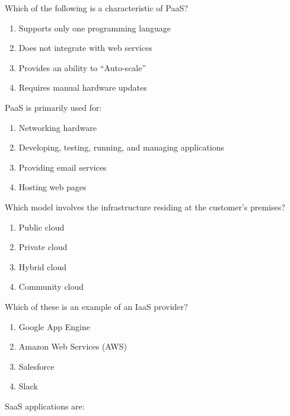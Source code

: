 \documentclass[11pt,a4paper]{article}
\begin{document}
\begin{parts}
  \item Which of the following is a characteristic of PaaS?
  
\begin{enumerate}[label=(\alph*)]
    \item Supports only one programming language
    \item Does not integrate with web services
    \item Provides an ability to ``Auto-scale''
    \item Requires manual hardware updates
  \end{enumerate}
  
  \item PaaS is primarily used for:
  
\begin{enumerate}[label=(\alph*)]
    \item Networking hardware
    \item Developing, testing, running, and managing applications
    \item Providing email services
    \item Hosting web pages
  \end{enumerate}
  
  \item Which model involves the infrastructure residing at the customer's premises?
  
\begin{enumerate}[label=(\alph*)]
    \item Public cloud
    \item Private cloud
    \item Hybrid cloud
    \item Community cloud
  \end{enumerate}
  
  \item Which of these is an example of an IaaS provider?
  
\begin{enumerate}[label=(\alph*)]
    \item Google App Engine
    \item Amazon Web Services (AWS)
    \item Salesforce
    \item Slack
  \end{enumerate}
  
  \item SaaS applications are:
  

\end{parts}
\end{document}
